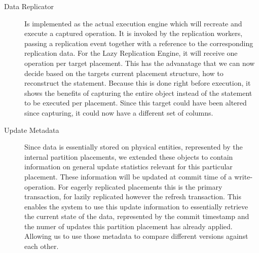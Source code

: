 \begin{description}
    \item[Data Replicator] Is implemented as the actual execution engine which will recreate and execute a captured operation. 
    It is invoked by the replication workers, passing a replication event together with a reference to the corresponding replication data.
    For the Lazy Replication Engine, it will receive one operation per target placement. 
    This has the advanatage that we can now decide based on the targets current placement structure, how to reconstruct the statement. 
    Because this is done right before execution, it shows the benefits of capturing the entire object instead of the statement to be executed per placement. 
    Since this target could have been altered since capturing, it could now have a different set of columns.



    \item[Update Metadata] Since data is essentially stored on physical entities, represented by the internal partition placements, we extended these objects 
    to contain information on general update statistics relevant for this particular placement. These information will be updated at commit time of a write-operation.
    For eagerly replicated placements this is the primary transaction, for lazily replicated however the refresh transaction.
    This enables the system to use this update information to essentially retrieve the current state of the data, represented by the commit timestamp
    and the numer of updates this partition placement has already applied. Allowing us to use those metadata to compare different versions against each other.

\end{description}



